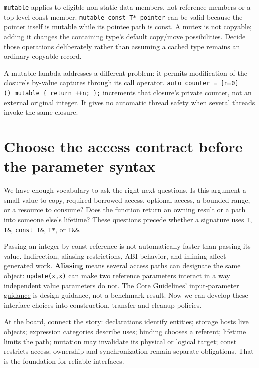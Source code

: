 \texttt{mutable} applies to eligible non-static data members, not reference members or a top-level const member. \texttt{mutable\ const\ T*\ pointer} can be valid because the pointer itself is mutable while its pointee path is const. A mutex is not copyable; adding it changes the containing type's default copy/move possibilities. Decide those operations deliberately rather than assuming a cached type remains an ordinary copyable record.

A mutable lambda addresses a different problem: it permits modification of the closure's by-value captures through its call operator. \texttt{auto\ counter\ =\ {[}n=0{]}()\ mutable\ \{\ return\ ++n;\ \};} increments that closure's private counter, not an external original integer. It gives no automatic thread safety when several threads invoke the same closure.

\section{Choose the access contract before the parameter syntax}\label{01-foundations-i-ch003-choose-the-access-contract-before-the-parameter-syntax}

We have enough vocabulary to ask the right next questions. Is this argument a small value to copy, required borrowed access, optional access, a bounded range, or a resource to consume? Does the function return an owning result or a path into someone else's lifetime? These questions precede whether a signature uses \texttt{T}, \texttt{T\&}, \texttt{const\ T\&}, \texttt{T*}, or \texttt{T\&\&}.

Passing an integer by const reference is not automatically faster than passing its value. Indirection, aliasing restrictions, ABI behavior, and inlining affect generated work. \textbf{Aliasing} means several access paths can designate the same object: \texttt{update(x,x)} can make two reference parameters interact in a way independent value parameters do not. The \href{https://isocpp.github.io/CppCoreGuidelines/CppCoreGuidelines\#f16-for-in-parameters-pass-cheaply-copied-types-by-value-and-others-by-reference-to-const}{Core Guidelines' input-parameter guidance} is design guidance, not a benchmark result. Now we can develop these interface choices into construction, transfer and cleanup policies.

At the board, connect the story: declarations identify entities; storage hosts live objects; expression categories describe uses; binding chooses a referent; lifetime limits the path; mutation may invalidate its physical or logical target; const restricts access; ownership and synchronization remain separate obligations. That is the foundation for reliable interfaces.

